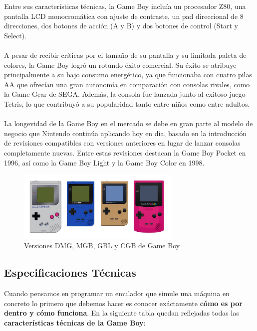 \clearpage

Entre sus características técnicas, la Game Boy incluía un procesador Z80, una pantalla LCD monocromática con ajuste de contraste, un pad direccional de 8 direcciones, dos botones de acción (A y B) y dos botones de control (Start y Select).
\\\\
A pesar de recibir críticas por el tamaño de su pantalla y su limitada paleta de colores, la Game Boy logró un rotundo éxito comercial. Su éxito se atribuye principalmente a su bajo consumo energético, ya que funcionaba con cuatro pilas AA que ofrecían una gran autonomía en comparación con consolas rivales, como la Game Gear de SEGA. Además, la consola fue lanzada junto al exitoso juego Tetris, lo que contribuyó a su popularidad tanto entre niños como entre adultos.
\\\\
La longevidad de la Game Boy en el mercado se debe en gran parte al modelo de negocio que Nintendo continúa aplicando hoy en día, basado en la introducción de revisiones compatibles con versiones anteriores en lugar de lanzar consolas completamente nuevas. Entre estas revisiones destacan la Game Boy Pocket en 1996, así como la Game Boy Light y la Game Boy Color en 1998.

\begin{figure}[H]
\centering
\includegraphics[width=0.7\textwidth]{include/images/gbs.jpg}
\caption{Versiones DMG, MGB, GBL y CGB de Game Boy}
\label{figure:v_gameboy}
\end{figure}

\clearpage

\subsection{Especificaciones Técnicas}

Cuando pensamos en programar un emulador que simule una máquina en concreto lo primero que debemos hacer es conocer exáctamente \textbf{cómo es por dentro y cómo funciona}. En la siguiente tabla quedan reflejadas todas las \textbf{características técnicas de la Game Boy}: \\

